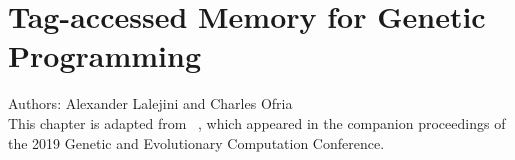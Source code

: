 \chapter{Tag-accessed Memory for Genetic Programming}
\label{chapter:tag-accessed-memory}

\noindent
Authors: Alexander Lalejini and Charles Ofria \\
This chapter is adapted from ~\citep{lalejini_tag-accessed_2019}, which appeared in the companion proceedings of the 2019 Genetic and Evolutionary Computation Conference.




